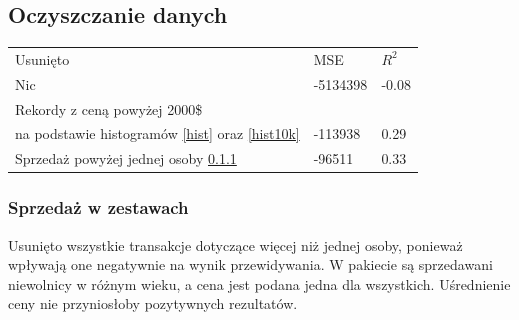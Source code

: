 \documentclass[a4paper,12pt]{article}
\begin{document}
	\subsection{Oczyszczanie danych}
		\begin{tabular}{lll}
			Usunięto	&	MSE		&	$R^2$\\
			Nic			&	-5134398	&	-0.08\\
			Rekordy z ceną powyżej 2000\$ \\
			na podstawie histogramów \ref{hist} 
			oraz \ref{hist10k}	&	-113938	&	0.29\\
			Sprzedaż powyżej jednej osoby \ref{wiecej_niz_jeden}
			&	-96511	&	0.33\\		
			
		\end{tabular}
		
		\subsubsection{Sprzedaż w zestawach}
		\label{wiecej_niz_jeden}
			Usunięto wszystkie transakcje dotyczące więcej niż jednej osoby, ponieważ wpływają one negatywnie na wynik przewidywania. W pakiecie są sprzedawani niewolnicy w różnym wieku, a cena jest podana jedna dla wszystkich. Uśrednienie ceny nie przyniosłoby pozytywnych rezultatów.
		
\end{document}
